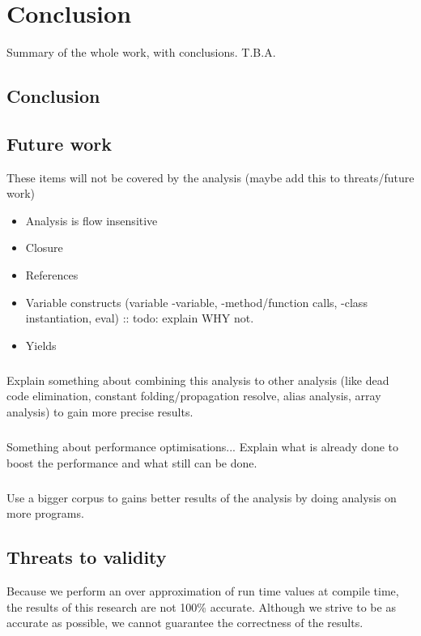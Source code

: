 \documentclass[main.tex]{subfiles}
\begin{document}
    \chapter{Conclusion}\label{ch:conclusion}
    Summary of the whole work, with conclusions. T.B.A.
    
    \section{Conclusion}
    
    \section{Future work}
    These items will not be covered by the analysis (maybe add this to threats/future work)
    \begin{itemize}
        \item Analysis is flow insensitive
        \item Closure
        \item References
        \item Variable constructs (variable -variable, -method/function calls, -class instantiation, eval) :: todo: explain WHY not.
        \item Yields
    \end{itemize}

    
    \paragraph{}
    Explain something about combining this analysis to other analysis (like dead code elimination, constant folding/propagation resolve, alias analysis, array analysis) to gain more precise results.
    
    \paragraph{}
    Something about performance optimisations... Explain what is already done to boost the performance and what still can be done.
        
    \paragraph{}
    Use a bigger corpus to gains better results of the analysis by doing analysis on more programs.
    
    \section{Threats to validity}	
    Because we perform an over approximation of run time values at compile time, the results of this research are not 100\% accurate.
	Although we strive to be as accurate as possible, we cannot guarantee the correctness of the results.
		
\end{document}
